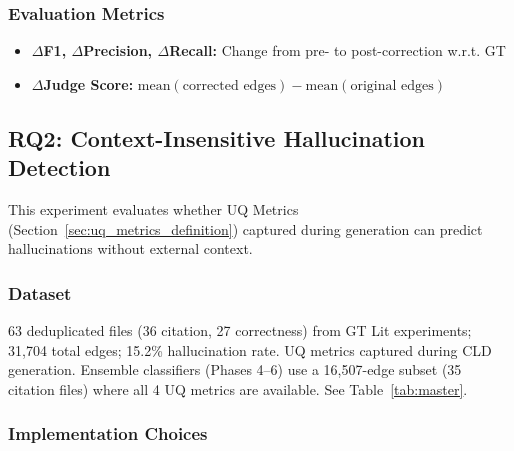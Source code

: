 \subsubsection{Evaluation Metrics}
\begin{itemize}[noitemsep]
    \item \textbf{$\Delta$F1, $\Delta$Precision, $\Delta$Recall:} Change from pre- to post-correction w.r.t. GT
    \item \textbf{$\Delta$Judge Score:} $\text{mean}(\text{corrected edges}) - \text{mean}(\text{original edges})$
\end{itemize}

\subsection{RQ2: Context-Insensitive Hallucination Detection}

This experiment evaluates whether UQ Metrics (Section~\ref{sec:uq_metrics_definition}) captured during generation can predict hallucinations without external context.

\subsubsection{Dataset}
63 deduplicated files (36 citation, 27 correctness) from GT Lit experiments; 31,704 total edges; 15.2\% hallucination rate. UQ metrics captured during CLD generation. Ensemble classifiers (Phases 4--6) use a 16,507-edge subset (35 citation files) where all 4 UQ metrics are available. See Table~\ref{tab:master}.

\subsubsection{Implementation Choices}

